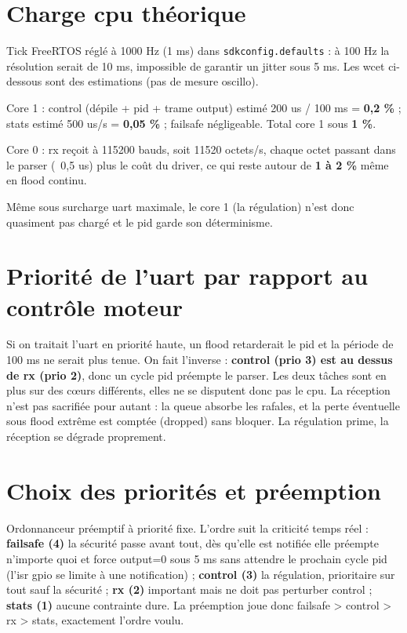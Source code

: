 \documentclass[a4paper,11pt]{article}
\begin{document}
\section{Charge cpu théorique}

Tick FreeRTOS réglé à 1000 Hz (1 ms) dans \texttt{sdkconfig.defaults} : à 100 Hz
la résolution serait de 10 ms, impossible de garantir un jitter sous 5 ms. Les
wcet ci-dessous sont des estimations (pas de mesure oscillo).

Core 1 : control (dépile + pid + trame output) estimé 200 us / 100 ms =
\textbf{0,2 \%} ; stats estimé 500 us/s = \textbf{0,05 \%} ; failsafe négligeable.
Total core 1 sous \textbf{1 \%}.

Core 0 : rx reçoit à 115200 bauds, soit 11520 octets/s, chaque octet passant dans
le parser (~0,5 us) plus le coût du driver, ce qui reste autour de \textbf{1 à
2 \%} même en flood continu.

Même sous surcharge uart maximale, le core 1 (la régulation) n'est donc quasiment
pas chargé et le pid garde son déterminisme.

\section{Priorité de l'uart par rapport au contrôle moteur}

Si on traitait l'uart en priorité haute, un flood retarderait le pid et la
période de 100 ms ne serait plus tenue. On fait l'inverse : \textbf{control
(prio 3) est au dessus de rx (prio 2)}, donc un cycle pid préempte le parser. Les
deux tâches sont en plus sur des cœurs différents, elles ne se disputent donc pas
le cpu. La réception n'est pas sacrifiée pour autant : la queue absorbe les
rafales, et la perte éventuelle sous flood extrême est comptée (dropped) sans
bloquer. La régulation prime, la réception se dégrade proprement.

\section{Choix des priorités et préemption}

Ordonnanceur préemptif à priorité fixe. L'ordre suit la criticité temps réel :
\textbf{failsafe (4)} la sécurité passe avant tout, dès qu'elle est notifiée elle
préempte n'importe quoi et force output=0 sous 5 ms sans attendre le prochain
cycle pid (l'isr gpio se limite à une notification) ; \textbf{control (3)} la
régulation, prioritaire sur tout sauf la sécurité ; \textbf{rx (2)} important mais
ne doit pas perturber control ; \textbf{stats (1)} aucune contrainte dure. La
préemption joue donc failsafe \textgreater{} control \textgreater{} rx
\textgreater{} stats, exactement l'ordre voulu.
\end{document}

